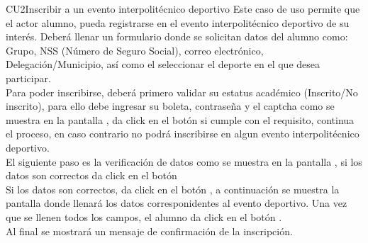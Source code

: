 \begin{UseCase}{CU2}{Inscribir a un evento interpolitécnico deportivo}{
		\noindent Este caso de uso permite que el actor alumno, pueda registrarse en el evento interpolitécnico deportivo de su interés. Deberá llenar un formulario donde se solicitan datos del alumno como: Grupo, NSS (Número de Seguro Social), correo electrónico, Delegación/Municipio, así como el seleccionar el deporte en el que desea participar.\\
        Para poder inscribirse, deberá primero validar su estatus académico (Inscrito/No inscrito), para ello debe ingresar su boleta, contraseña y el captcha como se muestra en la pantalla , da click en el botón  si cumple con el requisito, continua el proceso, en caso contrario no podrá inscribirse en algun evento interpolitécnico deportivo.\\
        El siguiente paso es la verificación de datos como se muestra en la pantalla , si los datos son correctos da click en el botón \\
        Si los datos son correctos, da click en el botón , a continuación se muestra la pantalla  donde llenará los datos corresponidentes al evento deportivo. Una vez que se llenen todos los campos, el alumno da click en el botón .\\ 
        Al final se mostrará un mensaje de confirmación de la inscripción.
	}
\end{UseCase}

